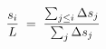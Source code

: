 \documentclass[preview]{standalone}
\begin{document}
\begin{align*}
\special{dvisvgm:raw <g id='unique000'>}\dfrac{s_i}{L} \;=\; \dfrac{\sum_{j \le i}\Delta s_j}{\sum_{j}\Delta s_j}\special{dvisvgm:raw </g>}
\end{align*}
\end{document}
